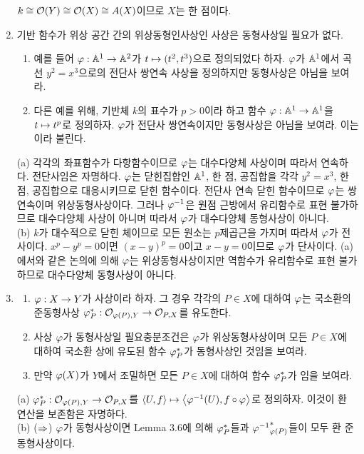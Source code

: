 \begin{enumerate}[label=\tb{3.\arabic*.},itemindent=0mm,itemsep=4mm]
		$k\cong\mathcal{O}(Y)\cong\mathcal{O}(X)\cong A(X)$이므로 $X$는 한 점이다.
		\item 기반 함수가 위상 공간 간의 위상동형인사상인 사상은 동형사상일 필요가 없다.
		\begin{enumerate}[label=(\alph*)]
			\item 예를 들어 $\varphi:\mathbb{A}^1\rightarrow\mathbb{A}^2$가 $t\mapsto(t^2,t^3)$으로 정의되었다 하자.
			$\varphi$가 $\mathbb{A}^1$에서 곡선 $y^2=x^3$으로의 전단사 쌍연속 사상을 정의하지만 동형사상은 아님을 보여라.
			\item 다른 예를 위해, 기반체 $k$의 표수가 $p>0$이라 하고 함수 $\varphi:\mathbb{A}^1\rightarrow\mathbb{A}^1$을 $t\mapsto t^p$로 정의하자.
			$\varphi$가 전단사 쌍연속이지만 동형사상은 아님을 보여라. 이는 이라 불린다.
		\end{enumerate}
		\sol (a) 각각의 좌표함수가 다항함수이므로 $\varphi$는 대수다양체 사상이며 따라서 연속하다. 전단사임은 자명하다.
		$\varphi$는 닫힌집합인 $\mathbb{A}^1$, 한 점, 공집합을 각각 $y^2=x^3$, 한 점, 공집합으로 대응시키므로 닫힌 함수이다.
		전단사 연속 닫힌 함수이므로 $\varphi$는 쌍연속이며 위상동형사상이다.
		그러나 $\varphi^{-1}$은 원점 근방에서 유리함수로 표현 불가하므로 대수다양체 사상이 아니며
		따라서 $\varphi$가 대수다양체 동형사상이 아니다.\\
		(b) $k$가 대수적으로 닫힌 체이므로 모든 원소는 $p$제곱근을 가지며 따라서 $\varphi$가 전사이다.
		$x^p-y^p=0$이면 $(x-y)^p=0$이고 $x-y=0$이므로 $\varphi$가 단사이다.
		(a)에서와 같은 논의에 의해 $\varphi$는 위상동형사상이지만 역함수가 유리함수로 표현 불가하므로 대수다양체 동형사상이 아니다.
		\item \begin{enumerate}[label=(\alph*)]
			\item $\varphi:X\rightarrow Y$가 사상이라 하자. 그 경우 각각의 $P\in X$에 대하여
			$\varphi$는 국소환의 준동형사상 $\varphi_P^*:\mathcal{O}_{\varphi(P),Y}\rightarrow\mathcal{O}_{P,X}$를 유도한다.
			\item 사상 $\varphi$가 동형사상일 필요충분조건은 $\varphi$가 위상동형사상이며
			모든 $P\in X$에 대하여 국소환 상에 유도된 함수 $\varphi_P^*$가 동형사상인 것임을 보여라.
			\item 만약 $\varphi(X)$가 $Y$에서 조밀하면 모든 $P\in X$에 대하여 함수 $\varphi_P^*$가 임을 보여라.
		\end{enumerate}
		\sol (a) $\varphi_P^*:\mathcal{O}_{\varphi(P),Y}\rightarrow\mathcal{O}_{P,X}$를 $\Braket{U,f}\mapsto\Braket{\varphi^{-1}(U),f\circ\varphi}$로 정의하자.
		이것이 환 연산을 보존함은 자명하다.\\
		(b) ($\Rightarrow$) $\varphi$가 동형사상이면 Lemma 3.6에 의해 $\varphi_P^*$들과 ${\varphi^{-1}}_{\varphi(P)}^*$들이 모두 환 준동형사상이다.

\end{enumerate}
